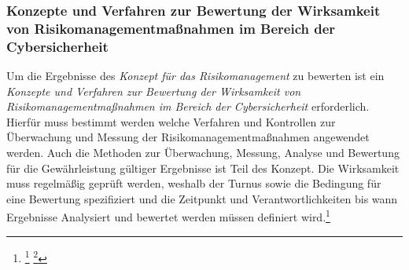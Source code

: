 \documentclass[11pt,a4paper,hidelinks]{article}   %
\begin{document}
            \subsubsection{Konzepte und Verfahren zur Bewertung der Wirksamkeit von Risikomanagementmaßnahmen im Bereich der Cybersicherheit}
            Um die Ergebnisse des \emph{Konzept für das Risikomanagement} zu bewerten ist ein \emph{Konzepte und Verfahren zur Bewertung der Wirksamkeit von Risikomanagementmaßnahmen im Bereich der Cybersicherheit} erforderlich. Hierfür muss bestimmt werden welche Verfahren und Kontrollen zur Überwachung und Messung der Risikomanagementmaßnahmen angewendet werden. Auch die Methoden zur Überwachung, Messung, Analyse und Bewertung für die Gewährleistung gültiger Ergebnisse ist Teil des Konzept. Die Wirksamkeit muss regelmäßig geprüft werden, weshalb der Turnus sowie die Bedingung für eine Bewertung spezifiziert und die Zeitpunkt und Verantwortlichkeiten bis wann Ergebnisse Analysiert und bewertet werden müssen definiert wird.\footnote{
                \footcite[Vgl. Nummer 7,][, Anhang]{EU2024-2690}
                \footcite[Vgl. §30 Absatz 2, Nummer 6,][]{NIS2UmsuCG}
            }

\end{document}
